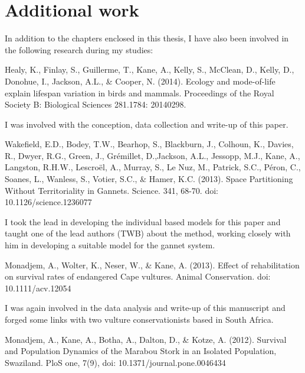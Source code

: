 \section{\uppercase{A}dditional work}
In addition to the chapters enclosed in this thesis, I have also been involved in the following research during my studies:\\
\begin{singlespace}
Healy, K., Finlay, S., Guillerme, T., Kane, A., Kelly, S., McClean, D., Kelly, D., Donohue, I., Jackson, A.L., \& Cooper, N. (2014). Ecology and mode-of-life explain lifespan variation in birds and mammals. Proceedings of the Royal Society B: Biological Sciences 281.1784: 20140298. \\
\end{singlespace}

\noindent
I was involved with the conception, data collection and write-up of this paper. \\
\begin{singlespace}
Wakefield, E.D., Bodey, T.W., Bearhop, S., Blackburn, J., Colhoun, K., Davies, R., Dwyer, R.G., Green, J., Gr{\'e}millet, D.,Jackson, A.L., Jessopp, M.J., Kane, A., Langston, R.H.W., Lescro{\"e}l, A., Murray, S., Le Nuz, M., Patrick, S.C., P{\'e}ron, C., Soanes, L., Wanless, S., Votier, S.C., \& Hamer, K.C. (2013). Space Partitioning Without Territoriality in Gannets. Science. 341, 68-70. doi: 10.1126/science.1236077 \\
\end{singlespace}
\noindent
	I took the lead in developing the individual based models for this paper and taught one of the lead authors (TWB) about the method, working closely with him in developing a suitable model for the gannet system. \\
\begin{singlespace}
Monadjem, A., Wolter, K., Neser, W., \& Kane, A. (2013). Effect of rehabilitation on survival rates of endangered Cape vultures. Animal Conservation. doi: 10.1111/acv.12054 \\
\end{singlespace}
\noindent
	I was again involved in the data analysis and write-up of this manuscript and forged some links with two vulture conservationists based in South Africa. \\
\begin{singlespace}
Monadjem, A., Kane, A., Botha, A., Dalton, D., \& Kotze, A. (2012). Survival and Population Dynamics of the Marabou Stork in an Isolated Population, Swaziland. PloS one, 7(9), doi: 10.1371/journal.pone.0046434 \\
\end{singlespace}
